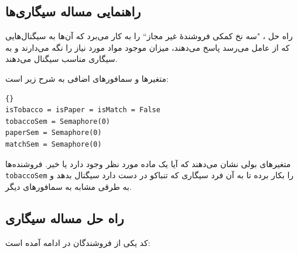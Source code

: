 \documentclass{book}
\newcommand{\clearemptydoublepage}{\newpage\cleardoublepage}
\begin{document}
\clearemptydoublepage
\subsection{راهنمایی مساله سیگاری‌ها}

    راه حل ، "سه نخ کمکی فروشندهٔ غیر مجاز`` را به کار می‌برد که آن‌ها به سیگنال‌هایی که از عامل‌
    می‌رسد پاسخ می‌دهند، میزان موجود مواد مورد نیاز را نگه می‌دارند و به سیگاری مناسب سیگنال می‌دهند. 

    متغیرها و سمافورهای اضافی به شرح زیر است: 

\begin{latin}
\begin{latin}
\begin{lstlisting}[title=\rl{راهنمایی مساله سیگاری‌ها}]{}
isTobacco = isPaper = isMatch = False
tobaccoSem = Semaphore(0)
paperSem = Semaphore(0)
matchSem = Semaphore(0)
\end{lstlisting}
\end{latin}
\end{latin}

    متغیرهای بولی نشان می‌دهند که آیا یک ماده مورد نظر وجود دارد یا خیر. 
    فروشنده‌‌ها {\tt tobaccoSem} را بکار برده تا به آن فرد سیگاری که تنباکو در دست دارد سیگنال بدهد و به طرقی مشابه به سمافورهای دیگر. 


\clearemptydoublepage
\subsection{راه حل مساله سیگاری}

    کد یکی از فروشندگان در ادامه آمده است:‌
\end{document}
